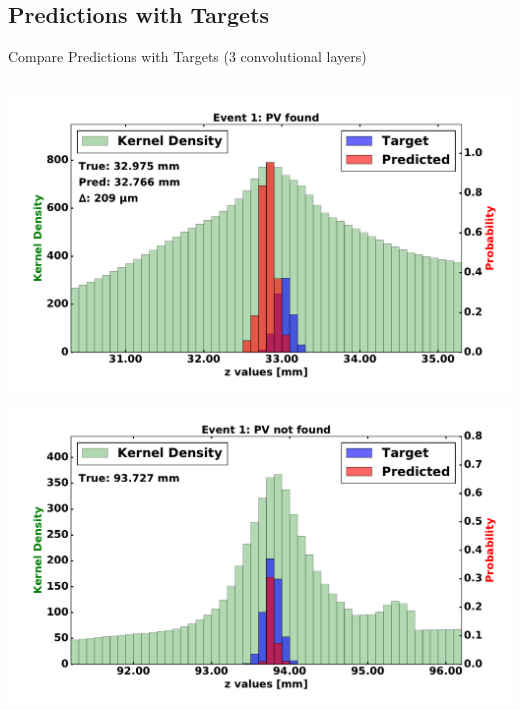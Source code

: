 %

\subsection{Predictions with Targets}
\begin{frame}{Compare Predictions with Targets (3 convolutional layers)}
  \begin{columns}[c]
        \begin{center}
            \includegraphics[width=1\textwidth,height=0.45\textwidth, trim=18 0 18 0]{images/120000_3layer_04.pdf}

            \includegraphics[width=1\textwidth, height=0.45\textwidth,trim=18 0 18 0]{images/120000_3layer_05.pdf}


\end{center}
\end{columns}
\end{frame}
